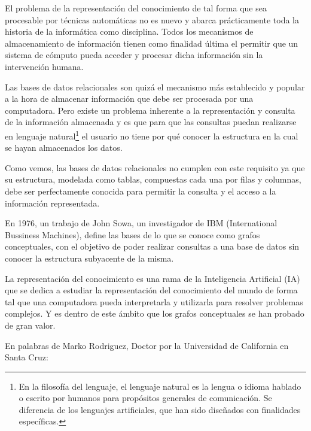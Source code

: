 	\ifdefined\borrador
	\fi
	
	
	El problema de la representación del conocimiento de tal forma que sea procesable por técnicas automáticas no es nuevo y abarca prácticamente toda la historia de la informática como disciplina. Todos los mecanismos de almacenamiento de información tienen como finalidad última el permitir que un sistema de cómputo pueda acceder y procesar dicha información sin la intervención humana.
	
	Las bases de datos relacionales son quizá el mecanismo más establecido y popular a la hora de almacenar información que debe ser procesada por una computadora. Pero existe un problema inherente a la representación y consulta de la información almacenada y es que para que las consultas puedan realizarse en lenguaje natural\footnote{En la filosofía del lenguaje, el lenguaje natural es la lengua o idioma hablado o escrito por humanos para propósitos generales de comunicación. Se diferencia de los lenguajes artificiales, que han sido diseñados con finalidades específicas.} el usuario no tiene por qué conocer la estructura en la cual se hayan almacenados los datos.
	
	Como vemos, las bases de datos relacionales no cumplen con este requisito ya que su estructura, modelada como tablas, compuestas cada una por filas y columnas, debe ser perfectamente conocida para permitir la consulta y el acceso a la información representada.
	
	En 1976, un trabajo de John Sowa, un investigador de IBM (International Bussiness Machines), define las bases de lo que se conoce como grafos conceptuales, con el objetivo de poder realizar consultas a una base de datos sin conocer la estructura subyacente de la misma.\cite{Sowa1976}
	
	La representación del conocimiento es una rama de la Inteligencia Artificial (IA) que se dedica a estudiar la representación del conocimiento del mundo de forma tal que una computadora pueda interpretarla y utilizarla para resolver problemas complejos. Y es dentro de este ámbito que los grafos conceptuales se han probado de gran valor.
	
	En palabras de Marko Rodriguez, Doctor por la Universidad de California en Santa Cruz:
	

